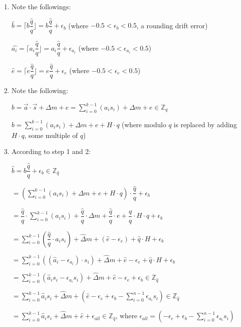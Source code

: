 \begin{myproof}
\begin{enumerate}
\item Note the followings: 

$\hat{b} = \Big\lceil b \dfrac{\hat{q}}{q} \Big\rfloor = b\dfrac{\hat{q}}{q} + \epsilon_b$ (where $-0.5 < \epsilon_b < 0.5$, a rounding drift error)

$\hat{a_i} = \Big\lceil a_i \dfrac{\hat{q}}{q} \Big\rfloor = a_i\dfrac{\hat{q}}{q} + \epsilon_{a_i}$ (where $-0.5 < \epsilon_{a_i} < 0.5$)

$\hat{e} = \Big\lceil e \dfrac{\hat{q}}{q} \Big\rfloor = e\dfrac{\hat{q}}{q} + \epsilon_e$ (where $-0.5 < \epsilon_e < 0.5$)
\item Note the following: 

$b = \vec{a} \cdot \vec{s} + \Delta  m + e = \sum\limits_{i=0}^{k-1}(a_is_i) + \Delta m + e  \in \mathbb{Z}_q$

$b = \sum\limits_{i=0}^{k-1}(a_is_i) + \Delta m + e + H \cdot q$ (where modulo $q$ is replaced by adding $H \cdot q$, some multiple of $q$)

\item According to step 1 and 2:

$\hat{b} = b\dfrac{\hat{q}}{q} + \epsilon_b \in \mathbb{Z}_{\hat{q}}$

$= \left(\sum\limits_{i=0}^{k-1}(a_is_i) + \Delta m + e + H \cdot q\right) \cdot \dfrac{\hat{q}}{q}  + \epsilon_b$

$= \dfrac{\hat{q}}{q} \cdot \sum\limits_{i=0}^{k-1}(a_is_i) + \dfrac{\hat{q}}{q} \cdot \Delta m + \dfrac{\hat{q}}{q} \cdot e + \dfrac{\hat{q}}{q} \cdot H \cdot q + \epsilon_b$

$= \sum\limits_{i=0}^{k-1}\left(\dfrac{\hat{q}}{q} \cdot a_is_i\right) + \hat{\Delta} m + (\hat{e} - \epsilon_e) + \hat{q}\cdot H + \epsilon_b$

$= \sum\limits_{i=0}^{k-1}\left((\hat{a}_i - \epsilon_{a_i}) \cdot s_i\right) + \hat{\Delta} m + \hat{e} - \epsilon_e + \hat{q}\cdot H + \epsilon_b$

$= \sum\limits_{i=0}^{k-1}(\hat{a}_is_i - \epsilon_{a_i}s_i) + \hat{\Delta} m + \hat{e} - \epsilon_e + \epsilon_b \in \mathbb{Z}_{\hat{q}}$

$= \sum\limits_{i=0}^{k-1}\hat{a}_is_i + \hat{\Delta} m + \left( \hat{e} - \epsilon_e + \epsilon_b - \sum\limits_{i=0}^{n-1}\epsilon_{a_i}s_i \right) \in \mathbb{Z}_{\hat{q}}$

$= \sum\limits_{i=0}^{k-1}\hat{a}_is_i + \hat{\Delta} m + \hat{e} + \epsilon_{\textit{all}} \in \mathbb{Z}_{\hat{q}}$, where $\epsilon_{\textit{all}} = \left(- \epsilon_e + \epsilon_b - \sum\limits_{i=0}^{n-1}\epsilon_{a_i}s_i \right)$


\end{enumerate}
\end{myproof}
